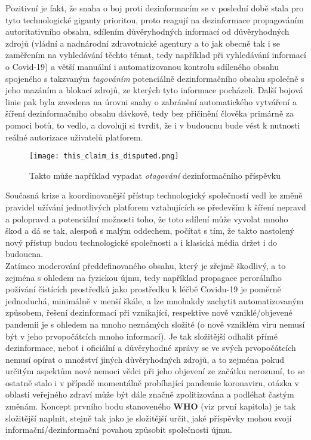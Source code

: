 Pozitivní je fakt, že snaha o boj proti dezinformacím se v poslední době stala pro tyto technologické giganty prioritou, proto reagují na dezinformace propagováním autoritativního obsahu, sdílením důvěryhodných informací od důvěryhodných zdrojů (vládní a nadnárodní zdravotnické agentury a to jak obecně tak i se zaměřením na vyhledávání těchto témat, tedy například při vyhledávání informací o Covid-19) a větší manuální i automatizovanou kontrolu sdíleného obsahu spojeného s takzvaným \textit{tagováním} potenciálně dezinformačního obsahu společně s jeho mazáním a blokací zdrojů, ze kterých tyto informace pocházeli. Další bojová linie pak byla zavedena na úrovni snahy o zabránění automatického vytváření a šíření dezinformačního obsahu dávkově, tedy bez přičinění člověka primárně za pomoci botů, to vedlo, a dovoluji si tvrdit, že i v budoucnu bude vést k nutnosti reálné autorizace uživatelů platforem.\\

\begin{figure}[htbp]
  \centering
  \texttt{[image: this\_claim\_is\_disputed.png]}
  \caption{Takto může například vypadat \textit{otagování} dezinformačního příspěvku}
  \label{fig:disputed_claim}
\end{figure}

Současná krize a koordinovanější přístup technologický společností vedl ke změně pravidel užívání jednotlivých platforem vztahujících se především k šíření nepravd a polopravd a potenciální možnosti toho, že toto sdílení může vyvolat mnoho škod a dá se tak, alespoň s malým oddechem, počítat s tím, že takto nastolený nový přístup budou technologické společnosti a i klasická média držet i do budoucna.\\


Zatímco moderování předdefinovaného obsahu, který je zřejmě škodlivý, a to zejména s ohledem na fyzickou újmu, tedy například propagace perorálního požívání čístících prostředků jako prostředku k léčbě Covidu-19 je poměrně jednoduchá, minimálně v menší škále, a lze mnohakdy zachytit automatizovaným způsobem, řešení dezinformací při vznikající, respektive nově vzniklé/objevené pandemii je s ohledem na mnoho neznámých složité (o nově vzniklém viru nemusí být v jeho prvopočátcích mnoho informací). Je tak složitější odhalit přímé dezinformace, neboť i oficiální a důvěryhodné zprávy se ve svých prvopočátcích nemusí opírat o množství jiných důvěryhodných zdrojů, a to zejména pokud určitým aspektům nové nemoci vědci při jeho objevení ze začátku nerozumí, to se ostatně stalo i v případě momentálně probíhající pandemie koronaviru, otázka v oblasti veřejného zdraví může být dále značně zpolitizována a podléhat častým změnám. Koncept prvního bodu stanoveného \textbf{WHO} (viz první kapitola) je tak složitější naplnit, stejně tak jako je složitější určit, jaké příspěvky mohou svojí informační/dezinformační povahou způsobit společnosti újmu.\\

